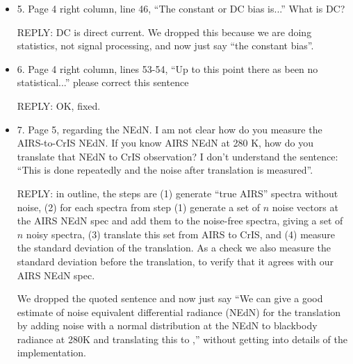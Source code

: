 \documentclass[11pt]{article}
\newcommand {\reply} {\mbox{\small REPLY}}
\begin{document}
\begin{itemize}
    \reply: The direct convolution is reference truth for the
    deconvolution, and is now labeled ``decon ref'' in the plots.
    We choose 2000 because this is an approximate match to the
    resolving power of the deconvolution.  Resolving power of the
    deconvolution is a property of the deconvolution---we just want
    to measure it.  We compared the deconvolution with reference
    truth for a range of resolving powers from 1200 to 2400 and
    chose 2000 because the residuals do not decrease much beyond
    that point.

    We don't use the Gaussian basis for the AIRS deconvolution or
    the AIRS to CrIS translation---it is used as a measure to see
    how well the deconvolution step alone works.  The deconvolution
    reference truth for a resolving power of 1200 is a very close
    match to the original AIRS radiances.

  \item 5. Page 4 right column, line 46, ``The constant or DC bias
    is...''  What is DC?

    \reply: DC is direct current.  We dropped this because we are
    doing statistics, not signal processing, and now just say ``the
    constant bias''.

  \item 6. Page 4 right column, lines 53-54, ``Up to this point
    there as been no statistical...'' please correct this sentence

    \reply: OK, fixed.

  \item 7. Page 5, regarding the NEdN. I am not clear how do you
    measure the AIRS-to-CrIS NEdN. If you know AIRS NEdN at 280 K,
    how do you translate that NEdN to CrIS observation? I don’t
    understand the sentence: ``This is done repeatedly and the noise
    after translation is measured''.

    \reply: in outline, the steps are (1) generate ``true AIRS''
    spectra without noise, (2) for each spectra from step (1)
    generate a set of $n$ noise vectors at the AIRS NEdN spec and
    add them to the noise-free spectra, giving a set of $n$ noisy
    spectra, (3) translate this set from AIRS to CrIS, and (4)
    measure the standard deviation of the translation.  As a check
    we also measure the standard deviation before the translation,
    to verify that it agrees with our AIRS NEdN spec.

    We dropped the quoted sentence and now just say
    ``We can give a good estimate of noise equivalent differential
    radiance (NEdN) for the translation by adding noise with a
    normal distribution at the {\airs} NEdN to blackbody radiance at
    280K and translating this to {\cris},'' without getting into
    details of the implementation.

\end{itemize}
\end{document}
